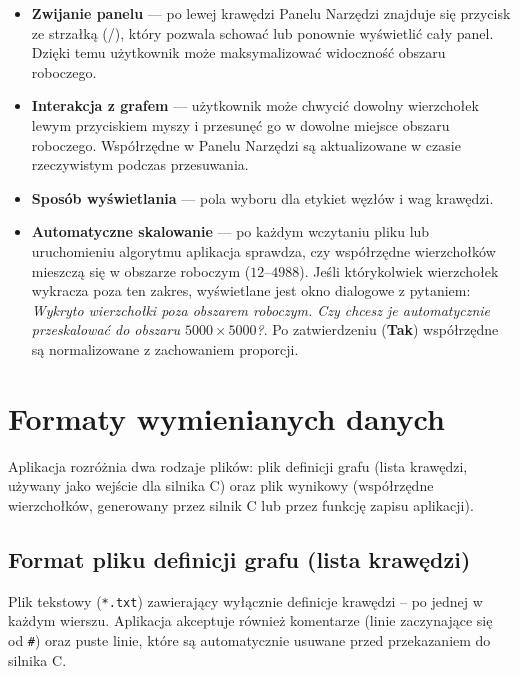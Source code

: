 \documentclass[a4paper, 11pt]{article}
\begin{document}
\begin{itemize}
  \item \textbf{Zwijanie panelu} --- po lewej kraw\k{e}dzi Panelu Narz\k{e}dzi znajduje si\k{e} przycisk ze strza\l{}k\k{a} (\texttt{\guillemotleft}/\texttt{\guillemotright}), kt\'ory pozwala schowa\'c lub ponownie wy\'swietli\'c ca\l{}y panel. Dzi\k{e}ki temu u\.zytkownik mo\.ze maksymalizowa\'c widoczno\'s\'c obszaru roboczego.

  \item \textbf{Interakcja z grafem} --- u\.zytkownik mo\.ze chwyci\'c dowolny wierzcho\l{}ek lewym przyciskiem myszy i przesun\k{e}\'c go w dowolne miejsce obszaru roboczego. Wsp\'o\l{}rz\k{e}dne w Panelu Narz\k{e}dzi s\k{a} aktualizowane w czasie rzeczywistym podczas przesuwania.

  \item \textbf{Spos\'ob wy\'swietlania} --- pola wyboru dla etykiet w\k{e}z\l{}\'ow i wag kraw\k{e}dzi.

  \item \textbf{Automatyczne skalowanie} --- po ka\.zdym wczytaniu pliku lub uruchomieniu algorytmu aplikacja sprawdza, czy wsp\'o\l{}rz\k{e}dne wierzcho\l{}k\'ow mieszcz\k{a} si\k{e} w obszarze roboczym ($12$--$4988$). Je\'sli kt\'orykolwiek wierzcho\l{}ek wykracza poza ten zakres, wy\'swietlane jest okno dialogowe z pytaniem: \textit{\guillemotleft{}Wykryto wierzcho\l{}ki poza obszarem roboczym. Czy chcesz je automatycznie przeskalowa\'c do obszaru $5000 \times 5000$?\guillemotright{}}. Po zatwierdzeniu (\textbf{Tak}) wsp\'o\l{}rz\k{e}dne s\k{a} normalizowane z zachowaniem proporcji.
\end{itemize}

\section{Formaty wymienianych danych}

Aplikacja rozróżnia dwa rodzaje plików: plik definicji grafu (lista krawędzi, używany jako wejście dla silnika C) oraz plik wynikowy (współrzędne wierzchołków, generowany przez silnik C lub przez funkcję zapisu aplikacji).

\subsection{Format pliku definicji grafu (lista krawędzi)}
Plik tekstowy (\texttt{*.txt}) zawierający wyłącznie definicje krawędzi – po jednej w każdym wierszu. Aplikacja akceptuje również komentarze (linie zaczynające się od \texttt{\#}) oraz puste linie, które są automatycznie usuwane przed przekazaniem do silnika C.
\end{document}
